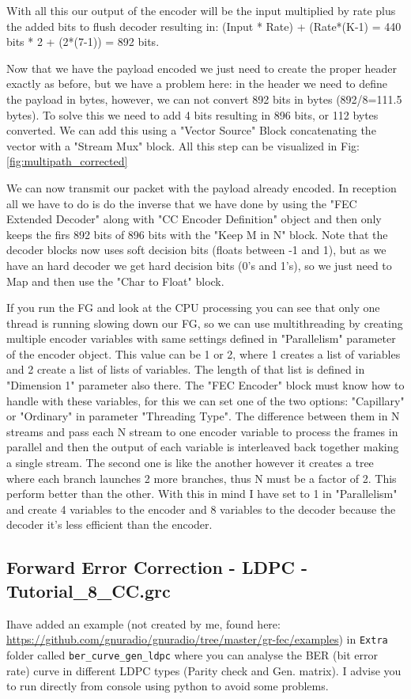 \documentclass[a4paper, 10pt, conference]{ieeeconf}      %
\begin{document}
    With all this our output of the encoder will be the input multiplied by rate plus the added bits to flush decoder resulting in: (Input * Rate) + (Rate*(K-1) = 440 bits * 2 + (2*(7-1)) = 892 bits.
    
    Now that we have the payload encoded we just need to create the proper header exactly as before, but we have a problem here: in the header we need to define the payload in bytes, however, we can not convert 892 bits in bytes (892/8=111.5 bytes). To solve this we need to add 4 bits resulting in 896 bits, or 112 bytes converted. We can add this using a "Vector Source" Block concatenating the vector with a "Stream Mux" block. All this step can be visualized in Fig: \ref{fig:multipath_corrected}
    
    We can now transmit our packet with the payload already encoded. In reception all we have to do is do the inverse that we have done by using the "FEC Extended Decoder" along with "CC Encoder Definition" object and then only keeps the firs 892 bits of 896 bits with the  "Keep M in N" block. Note that the decoder blocks now uses soft decision bits (floats between -1 and 1), but as we have an hard decoder we get hard decision bits (0's and 1's), so we just need to Map and  then use the "Char to Float" block.
    
    If you run the FG and look at the CPU processing you can see that only one thread is running slowing down our FG, so we can use multithreading by creating multiple encoder variables with same settings defined in "Parallelism" parameter of the encoder object. This value can be 1 or 2, where 1 creates a list of variables and 2 create a list of lists of variables. The length of that list is defined in "Dimension 1" parameter also there. The "FEC Encoder" block must know how to handle with these variables, for this we can set one of the two options: "Capillary" or "Ordinary" in parameter "Threading Type". The difference between them in N streams and pass each N stream to one encoder variable to process the frames in parallel and then the output of each variable is interleaved back together making a single stream. The second one is like the another however it creates a tree where each branch launches 2 more branches, thus N must be a factor of 2. This perform better than the other. With this in mind I have set to 1 in "Parallelism" and create 4 variables to the encoder and 8 variables to the decoder because the decoder it's less efficient than the encoder.
    

\subsection{Forward Error Correction - LDPC - Tutorial\_8\_CC.grc}
    Ihave added an example (not created by me, found here: \url{https://github.com/gnuradio/gnuradio/tree/master/gr-fec/examples}) in \verb|Extra| folder called \verb|ber_curve_gen_ldpc| where you can analyse the BER (bit error rate) curve in different LDPC types (Parity check and Gen. matrix). I advise you to run directly from console using python to avoid some problems.
\end{document}
